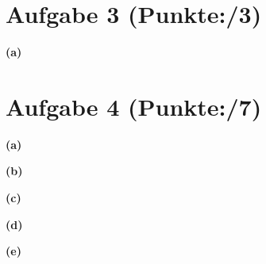 \documentclass[11pt, a4paper]{article}
\newcommand{\pp}{3}
\newcommand{\ppp}{7}
\begin{document}
\section*{Aufgabe 3 (Punkte:\qquad/\pp)}
\textbf{(a)}
\begin{adjustwidth}{20pt}{20pt}
	
\end{adjustwidth}




\section*{Aufgabe 4 (Punkte:\qquad/\ppp)}
\textbf{(a)}
\begin{adjustwidth}{20pt}{20pt}

\end{adjustwidth}
\textbf{(b)}
\begin{adjustwidth}{20pt}{20pt}

\end{adjustwidth}
\textbf{(c)}
\begin{adjustwidth}{20pt}{20pt}

\end{adjustwidth}
\textbf{(d)}
\begin{adjustwidth}{20pt}{20pt}

\end{adjustwidth}
\textbf{(e)}
\begin{adjustwidth}{20pt}{20pt}

\end{adjustwidth}
\end{document}
